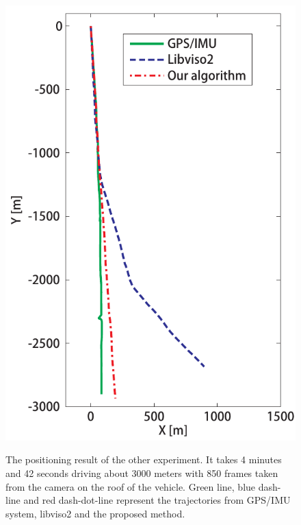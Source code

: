 \documentclass[letterpaper, 10 pt, conference]{ieeeconf}  %
\begin{document}
\begin{figure}[t]
\begin{minipage}[t]{0.42\linewidth}
    \includegraphics[width=1\textwidth]{source//Final//T_result_Frame200_1049.pdf}
    \label{fig:another_T_result}
  \end{minipage}%
\caption{The positioning result of the other experiment. It takes 4 minutes and 42 seconds driving about 3000 meters with 850 frames taken from the camera on the roof of the vehicle. Green line, blue dash-line and red dash-dot-line represent the trajectories from GPS/IMU system, libviso2 and the proposed method.}
\label{fig:another_result}
\end{figure}
\end{document}

